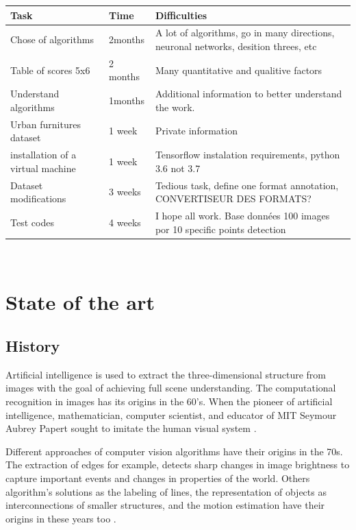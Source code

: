 \documentclass[10pt]{article}
\begin{document}
\begin{center}
\begin{tabular}{ ||p{3cm}|p{2cm}|p{8cm}||  }
\hline
Task & Time & Difficulties \\
\hline \hline
Chose of algorithms & 2months  & A lot of algorithms, go in many directions, neuronal networks, desition threes, etc  \\
\hline
Table of scores 5x6 & 2 months & Many quantitative and qualitive factors \\
\hline
Understand algorithms & 1months  & Additional information to better understand the work.  \\
\hline
Urban furnitures dataset & 1 week & Private information \\
\hline
installation of a virtual machine & 1 week & Tensorflow instalation requirements, python 3.6 not 3.7 \\
\hline
Dataset modifications & 3 weeks & Tedious task, define one format annotation, CONVERTISEUR DES FORMATS? \\
\hline
Test codes & 4 weeks & I hope all work. Base données 100 images por 10 specific points detection \\
\hline
\end{tabular}\\
\end{center}


    
    \newpage
    \section{State of the art}
    
    \subsection{History}
    \setlength{\parindent}{10ex} Artificial intelligence is used to extract the three-dimensional structure from images with the goal of achieving full scene understanding.
\setlength{\parindent}{0ex}The computational recognition in images has its origins in the 60's. When the pioneer of artificial intelligence, mathematician, computer scientist, and educator of MIT Seymour Aubrey Papert sought to imitate the human visual system \cite{papert1996seymour}.  

Different approaches of computer vision algorithms have their origins in the 70s. The extraction of edges for example, detects sharp changes in image brightness to capture important events and changes in properties of the world.
Others algorithm's solutions as the labeling of lines, the representation of objects as interconnections of smaller structures, and the motion estimation have their origins in these years too \cite{szeliski2010computer}.
\end{document}
